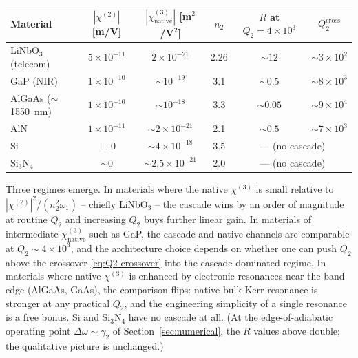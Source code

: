 \documentclass[11pt,a4paper]{article}
\newcommand{\chitwo}{\chi^{(2)}}
\newcommand{\chithree}{\chi^{(3)}}
\newcommand{\Dom}{\Delta\omega}
\begin{document}
\begin{center}
\begin{tabular}{lccccc}
\toprule
Material & $|\chitwo|$ [m/V] & $|\chithree_\text{native}|$ [m$^{2}$/V$^{2}$]
         & $n_2$ & $R$ at $Q_2{=}4{\times}10^{3}$ & $Q_2^\text{cross}$ \\
\midrule
LiNbO$_3$ (telecom)     & $5\!\times\!10^{-11}$   & $2\!\times\!10^{-21}$ & 2.26 & $\sim\!12$ & $\sim 3\!\times\!10^{2}$ \\
GaP (NIR)               & $1\!\times\!10^{-10}$   & $\sim\!10^{-19}$      & 3.1  & $\sim\!0.5$ & $\sim 8\!\times\!10^{3}$ \\
AlGaAs ($\sim$\,1550~nm)& $1\!\times\!10^{-10}$   & $\sim\!10^{-18}$      & 3.3  & $\sim\!0.05$ & $\sim 9\!\times\!10^{4}$ \\
AlN                     & $1\!\times\!10^{-11}$   & $\sim\!2\!\times\!10^{-21}$ & 2.1 & $\sim\!0.5$ & $\sim 7\!\times\!10^{3}$ \\
Si                      & $\equiv 0$              & $\sim\!4\!\times\!10^{-18}$ & 3.5  & \multicolumn{2}{c}{--- (no cascade)} \\
Si$_3$N$_4$             & $\sim 0$                & $\sim\!2.5\!\times\!10^{-21}$ & 2.0  & \multicolumn{2}{c}{--- (no cascade)} \\
\bottomrule
\end{tabular}
\end{center}

\noindent
Three regimes emerge.  In materials where the native $\chithree$ is
small relative to $|\chitwo|^{2}/(n_2^{2}\omega_1)$ -- chiefly
LiNbO$_3$ -- the cascade wins by an order of magnitude at routine
$Q_2$ and increasing $Q_2$ buys further linear gain.  In materials of
intermediate $\chithree_\text{native}$ such as GaP, the cascade and
native channels are comparable at $Q_2\sim 4\!\times\!10^{3}$, and the
architecture choice depends on whether one can push $Q_2$ above the
crossover \eqref{eq:Q2-crossover} into the cascade-dominated regime.
In materials where native $\chithree$ is enhanced by electronic
resonances near the band edge (AlGaAs, GaAs), the comparison flips:
native bulk-Kerr resonance is stronger at any practical $Q_2$, and
the engineering simplicity of a single resonance is a free bonus.
Si and Si$_3$N$_4$ have no cascade at all.  (At the
edge-of-adiabatic operating point $\Dom\!\sim\!\gamma_2$ of
Section~\ref{sec:numerical}, the $R$ values above double; the
qualitative picture is unchanged.)

\end{document}
